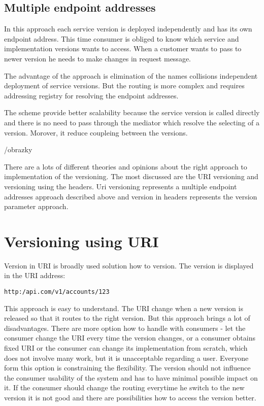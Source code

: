 \subsection{Multiple endpoint addresses}
In this approach each service version is deployed independently and has its own endpoint address. This time consumer is obliged to know which service and implementation versions wants to access. When a customer wants to pass to newer version he needs to make changes in request message. 

The advantage of the approach is elimination of the names collisions independent deployment of service versions. But the routing is more complex and requires addressing registry for resolving the endpoint addresses.

The scheme provide better scalability because the service version is called directly and there is no need to pass through the mediator which resolve the selecting of a version. Morover, it reduce coupleing between the versions.

/obrazky

There are a lots of different theories and opinions about the right approach to implementation of the versioning. The most discussed are the URI versioning and versioning using the headers. Uri versioning represents a multiple endpoint addresses approach described above and version in headers represents the version parameter approach.

\section{Versioning using URI}
Version in URI is broadly used solution how to version. The version is displayed in the URI address:

\texttt{http:/api.com/v1/accounts/123}

This approach is easy to understand. The URI change when a new version is released so that it routes to the right version. But this approach brings a lot of disadvantages. There are more option how to handle with consumers - let the consumer change the URI every time the version changes, or a consumer obtains fixed URI or the consumer can change its implementation from scratch, which does not involve many work, but it is unacceptable regarding a user.
Everyone form this option is constraining the flexibility.
The version should not influence the consumer usability of the system and has to have minimal possible impact on it. If the consumer should change the routing everytime he switch to the new version it is not good and there are possibilities how to access the version better.

